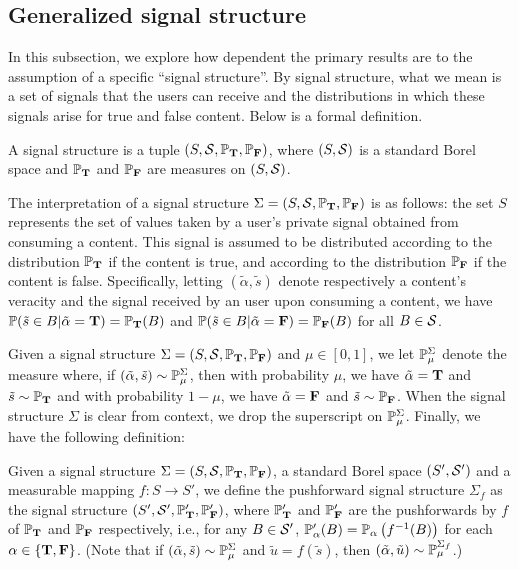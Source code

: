 \subsection{Generalized signal structure}\label{sub:signal_structure}
In this subsection, we explore how dependent the primary results are to the assumption of a specific ``signal structure''. By signal structure, what we mean is a set of signals that the users can receive and the distributions in which these signals arise for true and false content. Below is a formal definition. 
\begin{definition}
    A signal structure is a tuple $(S, \mathcal{S},  \mathbb{P}_{\mathbf{T}}, \mathbb{P}_{\mathbf{F}})$, where $(S, \mathcal{S})$ is a standard Borel space and $\mathbb{P}_{\mathbf{T}}$ and $\mathbb{P}_{\mathbf{F}}$ are measures on $(S, \mathcal{S})$.
\end{definition}
The interpretation of a signal structure $\Sigma = (S, \mathcal{S}, \mathbb{P}_{\mathbf{T}}, \mathbb{P}_{\mathbf{F}})$ is as follows: the set $S$ represents the set of values taken by a user's private signal  obtained from consuming a content. This signal is assumed to be distributed according to the distribution $\mathbb{P}_{\mathbf{T}}$ if the content is true, and according to the distribution $\mathbb{P}_{\mathbf{F}}$ if the content is false. Specifically, letting $(\tilde{\alpha}, \tilde{s})$ denote respectively a content's veracity and the signal received by an user upon consuming a content, we have $\mathbb{P}(\tilde{s} \in B | \tilde{\alpha} = \mathbf{T}) = \mathbb{P}_{\mathbf{T}}(B)$ and $\mathbb{P}(\tilde{s} \in B | \tilde{\alpha} = \mathbf{F}) = \mathbb{P}_{\mathbf{F}}(B)$ for all $B \in \mathcal{S}$.

Given a signal structure $\Sigma = (S, \mathcal{S}, \mathbb{P}_{\mathbf{T}}, \mathbb{P}_{\mathbf{F}})$ and $\mu \in [0,1]$, we let $\mathbb{P}_{\mu}^{\Sigma}$ denote the measure where, if $(\tilde{\alpha}, \tilde{s}) \sim \mathbb{P}_{\mu}^\Sigma$, then with probability $\mu$, we have $\tilde{\alpha} = \mathbf{T}$ and $\tilde{s} \sim \mathbb{P}_{\mathbf{T}}$ and with probability $1 - \mu$, we have $\tilde{\alpha} = \mathbf{F}$ and $\tilde{s} \sim  \mathbb{P}_{\mathbf{F}}$. When the signal structure $\Sigma$ is clear from context, we drop the superscript on $\mathbb{P}_\mu^\Sigma$. Finally, we have the following definition:
\begin{definition} Given a signal structure $\Sigma = (S, \mathcal{S}, \mathbb{P}_{\mathbf{T}}, \mathbb{P}_{\mathbf{F}})$, a standard Borel space $(S', \mathcal{S}')$ and a measurable mapping $f : S \to S'$, we define the pushforward signal structure $\Sigma_f$ as the signal structure $(S', \mathcal{S}', \mathbb{P}_{\mathbf{T}}', \mathbb{P}_{\mathbf{F}}')$, where $\mathbb{P}_{\mathbf{T}}'$ and $\mathbb{P}_{\mathbf{F}}'$ are the pushforwards by $f$ of   $\mathbb{P}_{\mathbf{T}}$ and $\mathbb{P}_{\mathbf{F}}$ respectively, i.e., for any $B \in \mathcal{S}'$, $\mathbb{P}_\alpha'( B) = \mathbb{P}_\alpha\left( f^{-1}(B)\right)$ for each $\alpha \in \{\mathbf{T}, \mathbf{F}\}$. (Note that if $(\tilde{\alpha}, \tilde{s}) \sim \mathbb{P}_{\mu}^\Sigma$ and $\tilde{u} = f(\tilde{s})$, then $(\tilde{\alpha}, \tilde{u}) \sim \mathbb{P}_\mu^{\Sigma_f}$.)  
\end{definition}

